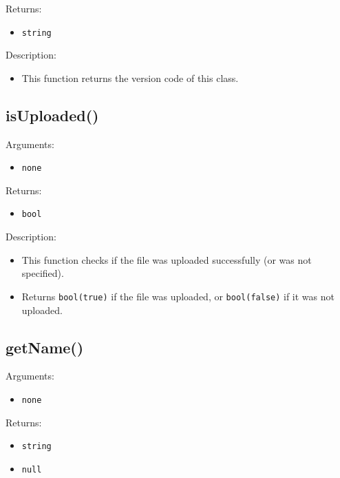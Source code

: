 \documentclass[10pt]{article}
\begin{document}
\noindent Returns:
\begin{itemize}
\item \verb!string!
\end{itemize}

\noindent Description:
\begin{itemize}
\item This function returns the version code of this class.
\end{itemize}


\subsection{isUploaded()}

\noindent Arguments:
\begin{itemize}
\item \verb!none!
\end{itemize}

\noindent Returns:
\begin{itemize}
\item \verb!bool!
\end{itemize}

\noindent Description:
\begin{itemize}
\item This function checks if the file was uploaded successfully (or was not specified).
\item Returns \texttt{bool(true)} if the file was uploaded, or \texttt{bool(false)} if it was not uploaded.
\end{itemize}


\subsection{getName()}

\noindent Arguments:
\begin{itemize}
\item \verb!none!
\end{itemize}

\noindent Returns:
\begin{itemize}
\item \verb!string!
\item \verb!null!
\end{itemize}
\end{document}
